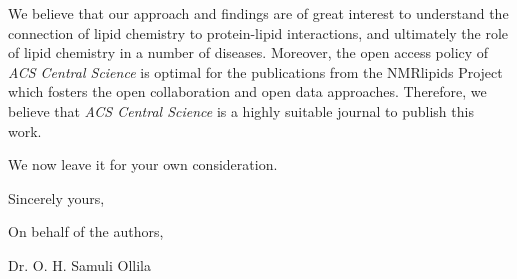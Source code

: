 \documentclass[11pt]{letter}
\begin{document}
We believe that our approach and findings are of great interest to understand the connection of lipid chemistry to protein-lipid interactions, and ultimately the role of lipid chemistry in a number of diseases. Moreover, the open access policy of {\it ACS Central Science} is optimal for the publications from the NMRlipids Project which fosters the open collaboration and open data approaches. Therefore, we believe that \textit{ACS Central Science} is a highly suitable journal to publish this work.   

We now leave it for your own consideration.

Sincerely yours,

On behalf of the authors,

Dr. O. H. Samuli Ollila
\end{document}
